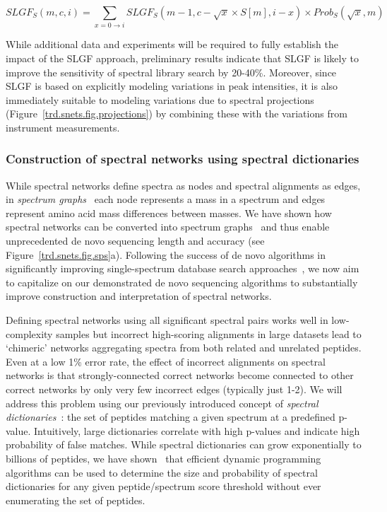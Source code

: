 \documentclass[arial,11pt]{article}
\begin{document}
\begin{equation}
SLGF_S(m,c,i) = \sum_{x=0\rightarrow i}
   SLGF_S( m-1, c-\sqrt{x}\times S[m], i-x ) \times Prob_S( \sqrt{x}, m )
\label{trd.snets.eqSLGF}
\end{equation}

While additional data and experiments will be required to fully establish the impact of the SLGF approach, preliminary results indicate that SLGF is likely to improve the sensitivity of spectral library search by 20-40\%. Moreover, since SLGF is based on explicitly modeling variations in peak intensities, it is also immediately suitable to modeling variations due to spectral projections (Figure~\ref{trd.snets.fig.projections}) by combining these with the variations from instrument measurements.

\subsubsection{Construction of spectral networks using spectral dictionaries}\label{trd.snets.aim.sn.nets}

While spectral networks define spectra as nodes and spectral alignments as edges, in {\em spectrum graphs}~\cite{bartels90} each node represents a mass in a spectrum and edges represent amino acid mass differences between masses. We have shown how spectral networks can be converted into spectrum graphs~\cite{bandeira04,bandeira07mcp} and thus enable~\cite{guthals12metasps} unprecedented de novo sequencing length and accuracy (see Figure~\ref{trd.snets.fig.sps}a). Following the success of de novo algorithms in significantly improving single-spectrum database search approaches~\cite{tanner05,frank05p,kim08,na11}, we now aim to capitalize on our demonstrated de novo sequencing algorithms to substantially improve construction and interpretation of spectral networks. %

Defining spectral networks using all significant spectral pairs works well in low-complexity samples but incorrect high-scoring alignments in large datasets lead to `chimeric' networks aggregating spectra from both related and unrelated peptides. Even at a low 1\% error rate, the effect of incorrect alignments on spectral networks is that strongly-connected correct networks become connected to other correct networks by only very few incorrect edges (typically just 1-2). We will address this problem using our previously introduced concept of {\em spectral dictionaries}~\cite{kim09msdict}: the set of peptides matching a given spectrum at a predefined p-value. Intuitively, large dictionaries correlate with high p-values and indicate high probability of false matches. While spectral dictionaries can grow exponentially to billions of peptides, we have shown~\cite{kim08,kim09msdict} that efficient dynamic programming algorithms can be used to determine the size and probability of spectral dictionaries for any given peptide/spectrum score threshold without ever enumerating the set of peptides.
\end{document}
